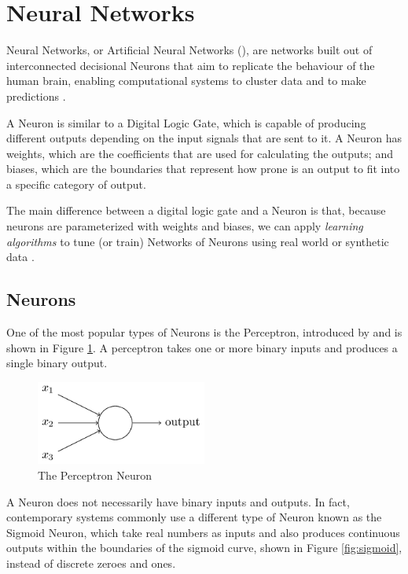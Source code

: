 \documentclass[openright]{normas-utf-tex} %
\begin{document}
\section{Neural Networks}

Neural Networks, or Artificial Neural Networks (),
are networks built out of interconnected decisional Neurons that aim to replicate 
the behaviour of the human brain, enabling computational systems to cluster data
and to make predictions \cite{IBMNeuralNetworks}. 

A Neuron is similar to a Digital Logic Gate, which is capable of producing 
different outputs depending on the input signals that are sent to it.
A Neuron has weights, which are the coefficients that are used for calculating
the outputs; and biases, which are the boundaries that represent how prone is an output
to fit into a specific category of output. 

The main difference between a digital logic gate and a Neuron is that, because neurons are
parameterized with weights and biases, we can apply \textit{learning algorithms}
to tune (or train) Networks of Neurons using real world or synthetic data \cite{Nielsen2015}.

\subsection{Neurons}

One of the most popular types of Neurons is the Perceptron, introduced by 
\cite{Rosenblatt1958} and is shown in Figure \ref{fig:perceptron}. 
A perceptron takes one or more binary inputs and produces a single binary output.

\begin{figure}[H]
	\centering
	\includegraphics[width=0.5\textwidth]{./images/perceptron.png}
	\caption[The Perceptron Neuron]{The Perceptron Neuron}
	\label{fig:perceptron}
\end{figure}

A Neuron does not necessarily have binary inputs and outputs. In fact,
contemporary systems commonly use a different type of Neuron known as the
Sigmoid Neuron, which take real numbers as inputs and also produces continuous
outputs within the boundaries of the sigmoid curve, shown in Figure
\ref{fig:sigmoid}, instead of discrete zeroes and ones.
\end{document}
